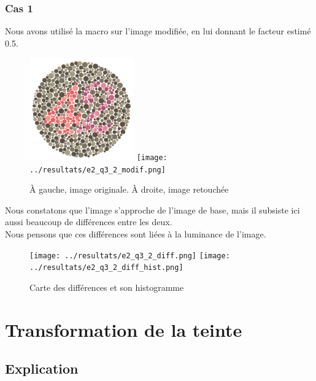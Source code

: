 \documentclass[a4paper]{article}
\begin{document}
\clearpage
\subsubsection{Cas 1}
Nous avons utilisé la macro sur l'image modifiée, en lui donnant le facteur estimé 0.5.

\begin{figure}[H]
\begin{center}
\includegraphics[width=170px]{../base/cas_1_dalton42.png}
\texttt{[image: ../resultats/e2\_q3\_2\_modif.png]}
\end{center}
\caption{À gauche, image originale. À droite, image retouchée}
\end{figure}

Nous constatons que l'image s'approche de l'image de base, mais il subsiste ici aussi beaucoup de différences entre les deux.\\
Nous pensons que ces différences sont liées à la luminance de l'image.

\begin{figure}[H]
\begin{center}
\texttt{[image: ../resultats/e2\_q3\_2\_diff.png]}
\texttt{[image: ../resultats/e2\_q3\_2\_diff\_hist.png]}
\end{center}
\caption{Carte des différences et son histogramme}
\end{figure}

\clearpage

\section{Transformation de la teinte}

\subsection{Explication}
\end{document}
